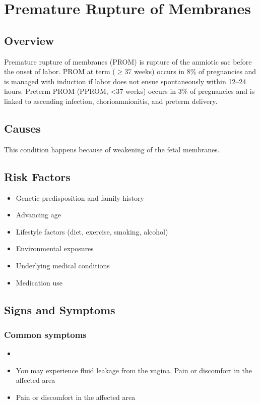 \chapter{Premature Rupture of Membranes}
\label{sec:Premature Rupture of Membranes}

\section{Overview}
Premature rupture of membranes (PROM) is rupture of the amniotic sac before the onset of labor. PROM at term ($\ge$37 weeks) occurs in 8\% of pregnancies and is managed with induction if labor does not ensue spontaneously within 12--24 hours. Preterm PROM (PPROM, <37 weeks) occurs in 3\% of pregnancies and is linked to ascending infection, chorioamnionitis, and preterm delivery.
\section{Causes}
This condition happens because of weakening of the fetal membranes.     
\section{Risk Factors}

\begin{itemize}[noitemsep]
  \item Genetic predisposition and family history
  \item Advancing age
  \item Lifestyle factors (diet, exercise, smoking, alcohol)
  \item Environmental exposures
  \item Underlying medical conditions
  \item Medication use
\end{itemize}
\section{Signs and Symptoms}

\subsection{Common symptoms}
\begin{itemize}[noitemsep]
  \item \item You may experience fluid leakage from the vagina. Pain or discomfort in the affected area    \item Pain or discomfort in the affected area
  \end{itemize}

